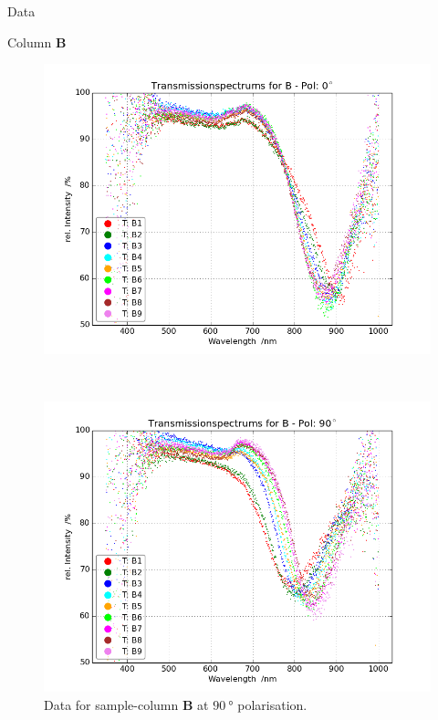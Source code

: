 \begin{appendix}
\begin{chapter}{Data}
\begin{section}{Column \textbf{B}}
      \begin{figure}[ht!]
        \centering
        \begin{minipage}{.92\textwidth}
          \centering
          \includegraphics[width=\textwidth]{Figures/TransspecRAW_BPol0.png}
          \caption{Data for sample-column \textbf{B} at $\SI{0}{\degree}$
              polarisation.}
          \label{fig:TransspecRAW_BPol0}
        \end{minipage}\\
        \begin{minipage}{.92\textwidth}
          \centering
          \includegraphics[width=\textwidth]{Figures/TransspecRAW_BPol90.png}
          \caption{Data for sample-column \textbf{B} at $\SI{90}{\degree}$
              polarisation.}
          \label{fig:TransspecRAW_BPol90}
        \end{minipage}
      \end{figure}
      

\end{section}
\end{chapter}
\end{appendix}
